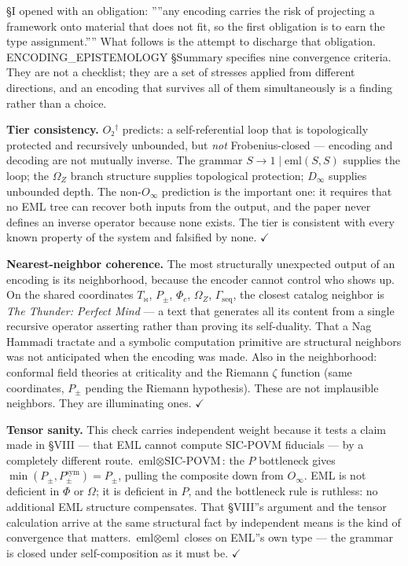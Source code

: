 \documentclass[12pt,a4paper]{article}
\newcommand{\pilcrow}{\S}
\begin{document}
\pilcrow{}I opened with an obligation: ''''any encoding carries the risk of projecting a
framework onto material that does not fit, so the first obligation is to earn the
type assignment.'''' What follows is the attempt to discharge that obligation.
ENCODING\_EPISTEMOLOGY \pilcrow{}Summary specifies nine convergence criteria. They are not
a checklist; they are a set of stresses applied from different directions, and
an encoding that survives all of them simultaneously is a finding rather than a
choice.

\textbf{Tier consistency.} $O₂^\dagger$ predicts: a self-referential loop that is
topologically protected and recursively unbounded, but \emph{not} Frobenius-closed ---
encoding and decoding are not mutually inverse. The grammar $S \to 1 \mid
\text{eml}(S,S)$ supplies the loop; the $\Omega_Z$ branch structure supplies
topological protection; $D_{\infty}$ supplies unbounded depth. The non-$O_{\infty}$
prediction is the important one: it requires that no EML tree can recover both
inputs from the output, and the paper never defines an inverse operator because
none exists. The tier is consistent with every known property of the system and
falsified by none. $\checkmark$

\textbf{Nearest-neighbor coherence.} The most structurally unexpected output of an
encoding is its neighborhood, because the encoder cannot control who shows up.
On the shared coordinates $T_{\bowtie}$, $P_{\pm}$, $\Phi_c$, $\Omega_Z$,
$\Gamma_\text{seq}$, the closest catalog neighbor is \emph{The Thunder: Perfect Mind}
--- a text that generates all its content from a single recursive operator asserting
rather than proving its self-duality. That a Nag Hammadi tractate and a symbolic
computation primitive are structural neighbors was not anticipated when the
encoding was made. Also in the neighborhood: conformal field theories at
criticality and the Riemann $\zeta$ function (same coordinates, $P_{\pm}$ pending
the Riemann hypothesis). These are not implausible neighbors. They are
illuminating ones. $\checkmark$

\textbf{Tensor sanity.} This check carries independent weight because it tests a
claim made in \pilcrow{}VIII --- that EML cannot compute SIC-POVM fiducials --- by a
completely different route. $\text{eml} \otimes \text{SIC-POVM}$: the $P$
bottleneck gives $\min(P_{\pm}, P_{\pm}^{\text{sym}}) = P_{\pm}$, pulling the
composite down from $O_{\infty}$. EML is not deficient in $\Phi$ or $\Omega$;
it is deficient in $P$, and the bottleneck rule is ruthless: no additional EML
structure compensates. That \pilcrow{}VIII''s argument and the tensor calculation arrive
at the same structural fact by independent means is the kind of convergence that
matters. $\text{eml} \otimes \text{eml}$ closes on EML''s own type --- the grammar
is closed under self-composition as it must be. $\checkmark$
\end{document}
